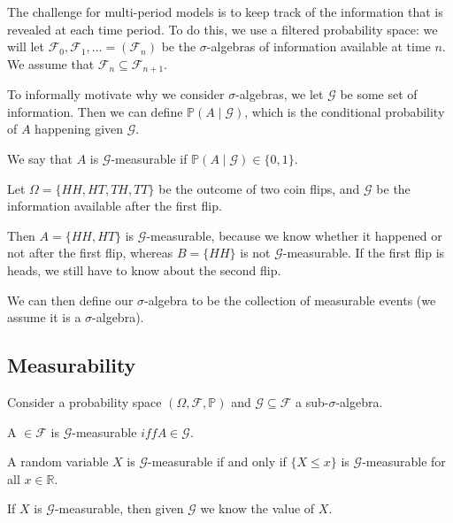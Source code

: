 \documentclass[12pt]{article}
\begin{document}
The challenge for multi-period models is to keep track of the information that is revealed at each time period. To do this, we use a filtered probability space: we will let $\mathcal{F}_0, \mathcal{F}_1, \ldots = (\mathcal{F}_n)$ be the $\sigma$-algebras of information available at time $n$. We assume that $\mathcal{F}_n \subseteq \mathcal{F}_{n+1}$.

To informally motivate why we consider $\sigma$-algebras, we let $\mathcal{G}$ be some set of information. Then we can define $\mathbb{P}(A \mid \mathcal{G})$, which is the conditional probability of $A$ happening given $\mathcal{G}$.

We say that $A$ is $\mathcal{G}$-measurable if $\mathbb{P}(A \mid \mathcal{G}) \in \{0, 1\}$.

\begin{exbox}
	Let $\Omega = \{HH, HT, TH, TT\}$ be the outcome of two coin flips, and $\mathcal{G}$ be the information available after the first flip.

	Then $A = \{HH, HT\}$ is $\mathcal{G}$-measurable, because we know whether it happened or not after the first flip, whereas $B = \{HH\}$ is not $\mathcal{G}$-measurable. If the first flip is heads, we still have to know about the second flip.
\end{exbox}

We can then define our $\sigma$-algebra to be the collection of measurable events (we assume it is a $\sigma$-algebra).

\subsection{Measurability}
\label{sub:meas}

Consider a probability space $(\Omega, \mathcal{F}, \mathbb{P})$ and $\mathcal{G} \subseteq \mathcal{F}$ a sub-$\sigma$-algebra.

\begin{definition}
	A $\in \mathcal{F}$ is $\mathcal{G}$-measurable $iff A \in \mathcal{G}$.

	A random variable $X$ is $\mathcal{G}$-measurable if and only if $\{X \leq x\}$ is $\mathcal{G}$-measurable for all $x \in \mathbb{R}$.
\end{definition}

\begin{remark}
	If $X$ is $\mathcal{G}$-measurable, then given $\mathcal{G}$ we know the value of $X$.
\end{remark}
\end{document}
